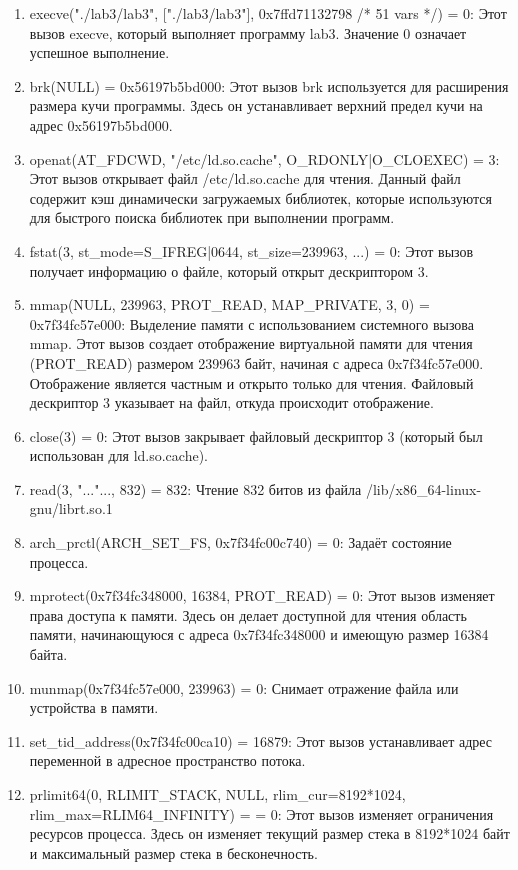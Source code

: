 \documentclass[a4paper, 12pt]{article}
\begin{document}
\begin{enumerate}
    \item execve("./lab3/lab3", ["./lab3/lab3"], 0x7ffd71132798 /* 51 vars */) = 0: Этот вызов execve, который выполняет программу lab3. Значение 0 означает успешное выполнение.
    \item brk(NULL) = 0x56197b5bd000: Этот вызов brk используется для расширения размера кучи программы. Здесь он устанавливает верхний предел кучи на адрес 0x56197b5bd000.
    \item openat(AT\_FDCWD, "/etc/ld.so.cache", O\_RDONLY|O\_CLOEXEC) = 3: Этот вызов открывает файл /etc/ld.so.cache для чтения. Данный файл содержит кэш динамически загружаемых библиотек, которые используются для быстрого поиска библиотек при выполнении программ.
    \item fstat(3, {st\_mode=S\_IFREG|0644, st\_size=239963, ...}) = 0:
    Этот вызов получает информацию о файле, который открыт дескриптором 3.
    \item mmap(NULL, 239963, PROT\_READ, MAP\_PRIVATE, 3, 0) = 0x7f34fc57e000: 
    Выделение памяти с использованием системного вызова mmap. Этот вызов создает отображение виртуальной памяти для чтения (PROT\_READ) размером 239963 байт, начиная с адреса 0x7f34fc57e000. Отображение является частным и открыто только для чтения. Файловый дескриптор 3 указывает на файл, откуда происходит отображение.
    \item close(3) = 0: Этот вызов закрывает файловый дескриптор 3 (который был использован для ld.so.cache).
    \item read(3, "..."..., 832) = 832:
    Чтение 832 битов из файла /lib/x86\_64-linux-gnu/librt.so.1
    \item arch\_prctl(ARCH\_SET\_FS, 0x7f34fc00c740) = 0: Задаёт состояние процесса.
    \item mprotect(0x7f34fc348000, 16384, PROT\_READ) = 0: Этот вызов изменяет права доступа к памяти. Здесь он делает доступной для чтения область памяти, начинающуюся с адреса 0x7f34fc348000 и имеющую размер 16384 байта.
    \item munmap(0x7f34fc57e000, 239963) = 0: Снимает отражение файла или устройства в памяти.
    \item set\_tid\_address(0x7f34fc00ca10) = 16879: Этот вызов устанавливает адрес переменной в адресное пространство потока.
    \item prlimit64(0, RLIMIT\_STACK, NULL, {rlim\_cur=8192*1024, \\      rlim\_max=RLIM64\_INFINITY}) = = 0: Этот вызов изменяет ограничения ресурсов процесса. Здесь он изменяет текущий размер стека в 8192*1024 байт и максимальный размер стека в бесконечность.

\end{enumerate}
\end{document}
